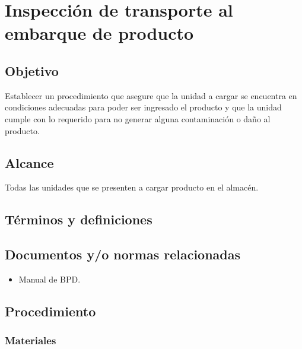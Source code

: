 \thispagestyle{formato-PI}
\renewcommand{\MayorVer}{2}
\renewcommand{\MenorVer}{0}
\renewcommand{\Codigo}{PSA-10-PRO} %
\renewcommand{\FechaPub}{2023--01}
\renewcommand{\TipoID}{PRO}
\renewcommand{\Titulo}{Inspección de transporte al embarque de producto}

\section{\Titulo}
\renewcommand{\Codigo}{\Prog--\thesection--\TipoID}
\subsection{Objetivo}
Establecer un procedimiento que asegure que la unidad a cargar se encuentra en condiciones adecuadas para poder ser ingresado el producto y que la unidad cumple con lo requerido para no generar alguna contaminación o daño al producto.

\subsection{Alcance}
Todas las unidades que se presenten a cargar producto en el almacén.

\subsection{Términos y definiciones}
\begin{description}
\end{description}

\subsection{Documentos y/o normas relacionadas}
	\begin{itemize}
		\item Manual de \gls{BPD}.
	\end{itemize}

\subsection{Procedimiento}

\subsubsection{Materiales}

